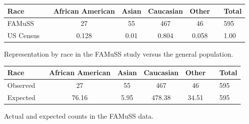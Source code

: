 \textD{\newpage}

\begin{figure}[h]
	\centering
	\begin{tabular}{ll ccc c ll}
		\hline
		Race	 & \hspace{2mm} & African American & Asian & Caucasian & Other & \hspace{2mm} & Total \\
		\hline
		FAMuSS &	& 27 & 55 & 467 & 46 & & 595 \\
		US Census	 & 		& 0.128 & 0.01 & 0.804 & 0.058 & & 1.00 \\
		\hline
	\end{tabular}
	\caption{Representation by race in the FAMuSS study versus the general population.}
    \label{famussRacialProportions}
\end{figure}

\begin{figure}[h]
	\centering
	\begin{tabular}{ll ccc c ll}
		\hline
		Race	 & \hspace{2mm} & African American & Asian & Caucasian & Other & \hspace{2mm} & Total \\
		\hline
		Observed &	& 27 & 55 & 467 & 46 & & 595 \\
		Expected & 	& 76.16 & 5.95 & 478.38 & 34.51 & & 595 \\
		\hline
	\end{tabular}
	\caption{Actual and expected counts in the FAMuSS data.}
    \label{actualExpectedRacialCountsFamuss}
\end{figure}



